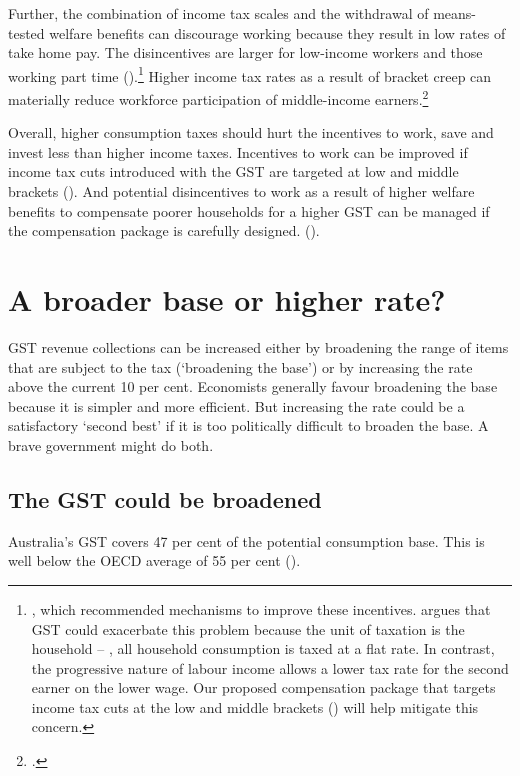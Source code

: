 \documentclass{grattanAlpha}
\begin{document}
Further, the combination of income tax scales and the withdrawal of means-tested welfare benefits can discourage working because they result in low rates of take home pay. The disincentives are larger for low-income workers and those working part time ().\footnote{\textcites{ProductivityCommission2015-Tax-and-transfer-incidence}{HardingNguVuPayneEtAl2009}{Reference-Group-On-Welfare-Reform-to-the-Minister-for-Social-Services-2015}, 
which recommended mechanisms to improve these incentives. \textcite{Apps2015} argues that GST could exacerbate this problem because the unit of taxation is the household – \ie, all household consumption is taxed at a flat rate. In contrast, the progressive nature of labour income allows a lower tax rate for the second earner on the lower wage. Our proposed compensation package that targets income tax cuts at the low and middle brackets () will help mitigate this concern.}  Higher income tax rates as a result of bracket creep can materially reduce workforce participation of middle-income earners.\footcite[][6]{DaleyWood2015FiscalChallenges}  

Overall, higher consumption taxes should hurt the incentives to work, save and invest less than higher income taxes. Incentives to work can be improved if income tax cuts introduced with the GST are targeted at low and middle brackets (). And potential disincentives to work as a result of higher welfare benefits to compensate poorer households for a higher GST can be managed if the compensation package is carefully designed. (). 

\chapter{A broader base or higher rate?}\label{chapter:GST-2}
GST revenue collections can be increased either by broadening the range of items that are subject to the tax (‘broadening the base’) or by increasing the rate above the current 10 per cent. Economists generally favour broadening the base because it is simpler and more efficient. But increasing the rate could be a satisfactory ‘second best’ if it is too politically difficult to broaden the base. A brave government might do both. 

\section{The GST could be broadened}\label{sec:GST-2-1}
Australia’s GST covers 47 per cent of the potential consumption base. This is well below the OECD average of 55 per cent ().
\end{document}
